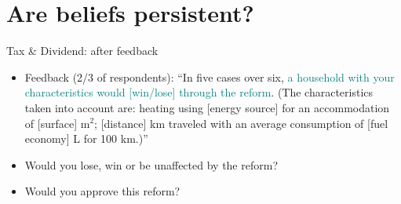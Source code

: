 \documentclass[aspectratio=169,9pt,dvipsnames]{beamer}
\begin{document}
\section{Are beliefs persistent?}

    \begin{frame}{Tax \& Dividend: after feedback} \label{main_reform}
\begin{itemize}
   \item Feedback (2/3 of respondents): ``In five cases over six, \textcolor{teal}{a household with your characteristics would {[}win/lose{]} through the reform}. (The characteristics taken into account are: heating using {[}energy source{]} for an accommodation of {[}surface{]} m$^{2}$; {[}distance{]} km traveled with an average consumption of {[}fuel economy{]} L for 100 km.)'' \medskip
    \item Would you lose, win or be unaffected by the reform? \medskip
    \item Would you approve this reform?
\end{itemize}
    \end{frame}
    
\end{document}
